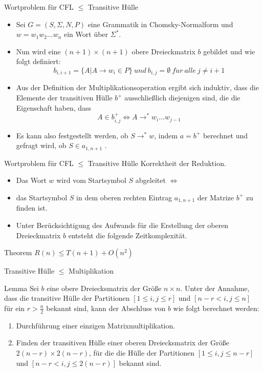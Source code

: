 \documentclass{beamer}
\begin{document}
	\begin{frame}{Wortproblem für CFL $\le$ Transitive Hülle}
		\begin{itemize}
			\item Sei $G = (S, \Sigma, N, P)$ eine Grammatik in Chomsky-Normalform und $w=w_1 w_2 \ldots w_n$ ein Wort über $\Sigma^*$.
			\pause
			\item Nun wird eine $(n+1)\times (n+1)$ obere Dreieckmatrix $b$ gebildet und wie folgt definiert:
			$$b_{i,i+1} = \{ A | A\to w_i \in P\} \ und \ b_{i,j}= \emptyset \ f\ddot{u}r \ alle \ j \neq i+1$$
			\pause
			\item Aus der Definition der Multiplikationsoperation ergibt sich induktiv, dass die
			Elemente der transitiven Hülle $b^+$ ausschließlich diejenigen sind, die die Eigenschaft haben, dass 
			$$A \in b_{i,j}^+ \Leftrightarrow A \to^* w_i \ldots w_{j-1}$$
			\pause
			\item Es kann also festgestellt werden, ob $S \to^* w$, indem $a = b^+$ berechnet und
			gefragt wird, ob $S \in a_{1,n+1}$ .
		\end{itemize}
	\end{frame}

	\begin{frame}{Wortproblem für CFL $\le$ Transitive Hülle}
		Korrektheit der Reduktion.
		\begin{itemize}
			\item Das Wort $w$ wird vom Startsymbol $S$ abgeleitet $\Longleftrightarrow$
			\item das Startsymbol $S$ in dem oberen rechten Eintrag $a_{1,n+1}$ der Matrize $b^+$ zu finden ist.
			\pause
			\item Unter Berücksichtigung des Aufwands für die Erstellung der oberen Dreieckmatrix $b$ entsteht die folgende Zeitkomplexität.
		\end{itemize}
		\begin{block}{Theorem}
			$R(n) \le T(n+1) + O(n^2)$
		\end{block}
	\end{frame}

	\begin{frame}{Transitive Hülle $\le$ Multiplikation}
		\begin{block}{Lemma}
			Sei $b$ eine obere Dreiecksmatrix der Größe $n \times n$. Unter der Annahme, dass die transitive Hülle der Partitionen $[1\le i,j\le r]$ und $[n-r < i,j\le n]$ für ein $r > \frac{n}{2}$ bekannt sind, kann der Abschluss von $b$ wie folgt berechnet werden:
			\begin{enumerate}
				\item Durchführung einer einzigen Matrixmultiplikation.
				\item Finden der transitiven Hülle einer oberen Dreiecksmatrix der Größe $2(n-r) \times 2(n-r)$, für die die Hülle der Partitionen $[1\le i,j\le n-r]$ und $[n-r < i,j\le 2(n-r)]$ bekannt sind.
			\end{enumerate}
		\end{block}
	\end{frame}
\end{document}
